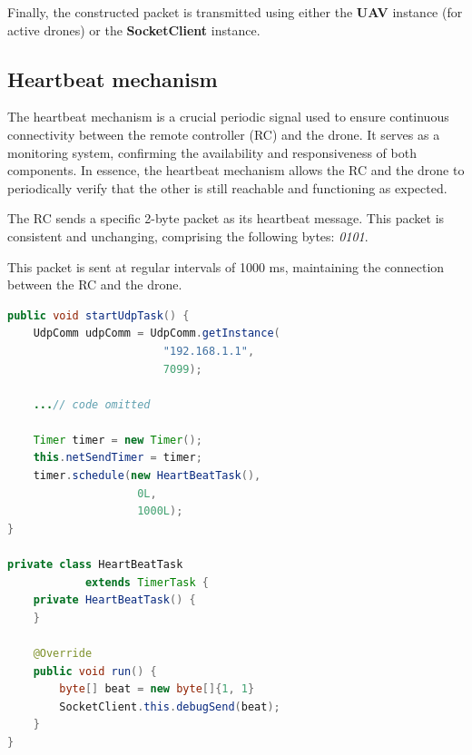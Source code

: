 Finally, the constructed packet is transmitted using either the \textbf{UAV} instance (for active drones) or the \textbf{SocketClient} instance.



\subsection*{Heartbeat mechanism}
The heartbeat mechanism is a crucial periodic signal used to ensure continuous connectivity between the remote controller (RC) and the drone. It serves as a monitoring system, confirming the availability and responsiveness of both components. In essence, the heartbeat mechanism allows the RC and the drone to periodically verify that the other is still reachable and functioning as expected.

The RC sends a specific 2-byte packet as its heartbeat message. This packet is consistent and unchanging, comprising the following bytes:
\textit{0101}.

This packet is sent at regular intervals of 1000 ms, maintaining the connection between the RC and the drone.
\begin{lstlisting}[language=Java, basicstyle=\small, caption=Heartbeat mechanism] %% codice Heartbeat.run leggermente modificato rispetto all'originale perchè altrimenti non stava nella colonna
public void startUdpTask() {
    UdpComm udpComm = UdpComm.getInstance(
                        "192.168.1.1", 
                        7099);
                                           
    ...// code omitted
    
    Timer timer = new Timer();
    this.netSendTimer = timer;
    timer.schedule(new HeartBeatTask(), 
                    0L, 
                    1000L);
}
    
private class HeartBeatTask 
            extends TimerTask {
    private HeartBeatTask() {
    }

    @Override
    public void run() {
        byte[] beat = new byte[]{1, 1}
        SocketClient.this.debugSend(beat); 
    }
}
\end{lstlisting}